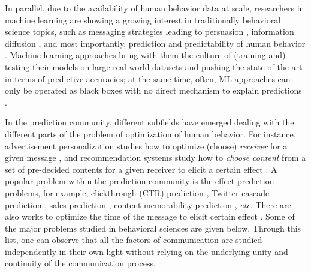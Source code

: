 In parallel, due to the availability of human behavior data at scale, researchers in machine learning are showing a growing interest in traditionally behavioral science topics, such as messaging strategies leading to persuasion \cite{habernal2016makes,kumar2023persuasion,luu2019measuring,bhattacharya2023video}, information diffusion \cite{cheng2014can,martin2016exploring}, and most importantly, prediction and predictability of human behavior \cite{choi2012predicting,song2010limits}. Machine learning approaches bring with them the culture of (training and) testing their models on large real-world datasets and pushing the state-of-the-art in terms of predictive accuracies; at the same time, often, ML approaches can only be operated as black boxes with no direct mechanism to explain predictions \cite{salganik2019bit,singla2022audio}.


In the prediction community, different subfields have emerged dealing with the different parts of the problem of optimization of human behavior. For instance, advertisement personalization studies how to optimize (choose) \textit{receiver} for a given message \cite{chandra2022personalization}, and recommendation systems study how to \textit{choose content} from a set of pre-decided contents for a given receiver to elicit a certain effect \cite{herlocker2004evaluating}. A popular problem within the prediction community is the effect prediction problems, for example, clickthrough (CTR) prediction \cite{mcmahan2013ad}, Twitter cascade prediction \cite{cheng2014can,martin2016exploring}, sales prediction \cite{choi2012predicting,pryzant2017predicting}, content memorability prediction \cite{isola2011makes,khosla2015understanding,si2023long}, \textit{etc}. There are also works to optimize the time of the message to elicit certain effect \cite{newstead2010cost,si2023long}. Some of the major problems studied in behavioral sciences are given below. Through this list, one can observe that all the factors of communication are studied independently in their own light without relying on the underlying unity and continuity of the communication process. 


